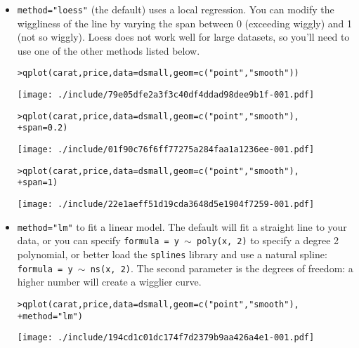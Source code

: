 \begin{itemize}
	\item {\tt method="loess"} (the default) uses a local regression.  You can modify the wiggliness of the line by varying the span between 0 (exceeding wiggly) and 1 (not so wiggly).  Loess does not work well for large datasets, so you'll need to use one of the other methods listed below.

\begin{alltt}
> qplot(carat, price, data = dsmall, geom = c("point", "smooth"))
\end{alltt}
\texttt{[image: ./include/79e05dfe2a3f3c40df4ddad98dee9b1f-001.pdf]}
\begin{alltt}

> qplot(carat, price, data = dsmall, geom = c("point", "smooth"), 
+     span = 0.2)
\end{alltt}
\texttt{[image: ./include/01f90c76f6ff77275a284faa1a1236ee-001.pdf]}
\begin{alltt}

> qplot(carat, price, data = dsmall, geom = c("point", "smooth"), 
+     span = 1)
\end{alltt}
\texttt{[image: ./include/22e1aeff51d19cda3648d5e1904f7259-001.pdf]}
\begin{alltt}

\end{alltt}

	\item {\tt method="lm"} to fit a linear model.  The default will fit a straight line to your data, or you can specify {\tt formula = y $\sim$ poly(x, 2)} to specify a degree 2 polynomial, or better load the {\tt splines} library and use a natural spline: {\tt formula = y $\sim$ ns(x, 2)}.  The second parameter is the degrees of freedom: a higher number will create a wigglier curve.

\begin{alltt}
> qplot(carat, price, data = dsmall, geom = c("point", "smooth"), 
+     method = "lm")
\end{alltt}
\texttt{[image: ./include/194cd1c01dc174f7d2379b9aa426a4e1-001.pdf]}
\begin{alltt}


\end{alltt}
\end{itemize}
